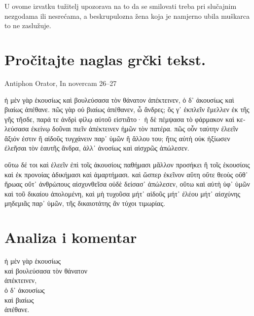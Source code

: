 U ovome izvatku tužitelj upozorava na to da se smilovati treba pri slučajnim nezgodama ili nesrećama, a beskrupulozna žena koja je namjerno ubila muškarca to ne zaslužuje.



\section*{Pročitajte naglas grčki tekst.}

Antiphon Orator, In novercam 26–27


\medskip


{\large

\begin{greek}

\noindent ἡ μὲν γὰρ ἑκουσίως καὶ βουλεύσασα τὸν θάνατον ἀπέκτεινεν, ὁ δ᾽ ἀκουσίως καὶ βιαίως ἀπέθανε. πῶς γὰρ οὐ βιαίως ἀπέθανεν, ὦ ἄνδρες; ὅς γ᾽ ἐκπλεῖν ἔμελλεν ἐκ τῆς γῆς τῆσδε, παρά τε ἀνδρὶ φίλῳ αὑτοῦ εἱστιᾶτο· ἡ δὲ πέμψασα τὸ φάρμακον καὶ κελεύσασα ἐκείνῳ δοῦναι πιεῖν ἀπέκτεινεν ἡμῶν τὸν πατέρα. πῶς οὖν ταύτην ἐλεεῖν ἄξιόν ἐστιν ἢ αἰδοῦς τυγχάνειν παρ᾽ ὑμῶν ἢ ἄλλου του; ἥτις αὐτὴ οὐκ ἠξίωσεν ἐλεῆσαι τὸν ἑαυτῆς ἄνδρα, ἀλλ᾽ ἀνοσίως καὶ αἰσχρῶς ἀπώλεσεν.

οὕτω δέ τοι καὶ ἐλεεῖν ἐπὶ τοῖς ἀκουσίοις παθήμασι μᾶλλον προσήκει ἢ τοῖς ἑκουσίοις καὶ ἐκ προνοίας ἀδικήμασι καὶ ἁμαρτήμασι. καὶ ὥσπερ ἐκεῖνον αὕτη οὔτε θεοὺς οὔθ᾽ ἥρωας οὔτ᾽ ἀνθρώπους αἰσχυνθεῖσα οὐδὲ δείσασ᾽ ἀπώλεσεν, οὕτω καὶ αὐτὴ ὑφ᾽ ὑμῶν καὶ τοῦ δικαίου ἀπολομένη, καὶ μὴ τυχοῦσα μήτ᾽ αἰδοῦς μήτ᾽ ἐλέου μήτ᾽ αἰσχύνης μηδεμιᾶς παρ᾽ ὑμῶν, τῆς δικαιοτάτης ἂν τύχοι τιμωρίας.

\end{greek}

}


\section*{Analiza i komentar}


{\large
\begin{greek}
\noindent ἡ μὲν γὰρ ἑκουσίως \\
\tabto{2em} καὶ βουλεύσασα τὸν θάνατον \\
ἀπέκτεινεν, \\
ὁ δ᾽ ἀκουσίως \\
\tabto{2em} καὶ βιαίως \\
ἀπέθανε.\\

\end{greek}
}

